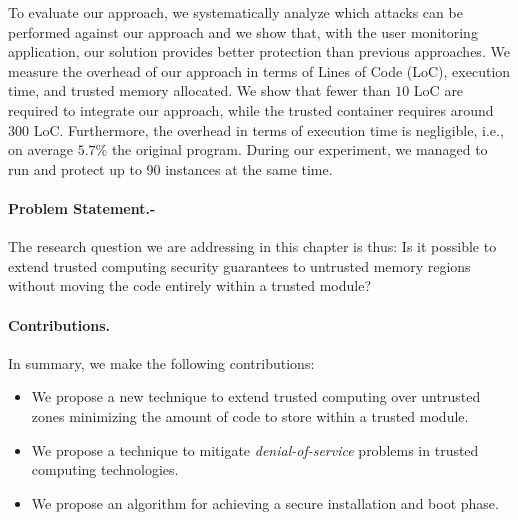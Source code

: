 To evaluate our approach, we systematically analyze which attacks can be 
performed against our approach and we show that, with the user monitoring 
application, our solution provides better protection than previous approaches. 
We measure the overhead of our approach in terms of Lines of Code (LoC), 
execution time, and trusted memory allocated. We 
show that fewer than $10$ LoC are required to 
integrate our approach, while the trusted container requires around $300$ LoC.
Furthermore, the overhead in terms of execution time is 
negligible, i.e., on average $5.7\%$ \wrt the original program.
During our experiment, we managed to run and protect up to 90 instances at the 
same time.

\vspace{-0.25cm}
\paragraph{Problem Statement.-}
The research question we are addressing in this chapter is thus: Is it possible 
to extend trusted computing security guarantees to untrusted memory regions 
without moving the code entirely within a trusted module?

\vspace{-0.25cm}
\paragraph{Contributions.} In summary, we make the following contributions:

\begin{itemize}
	\item We propose a new technique to extend trusted computing over untrusted 
	zones minimizing the amount of code to store within a trusted module.
	\item We propose a technique to mitigate \emph{denial-of-service} problems 
	in trusted computing technologies.
	\item We propose an algorithm for achieving a secure installation and boot 
	phase.
\end{itemize}

